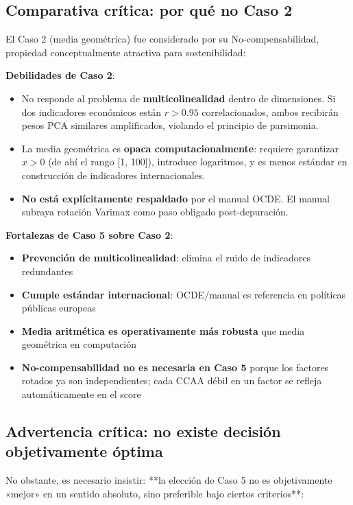 \subsection{Comparativa crítica: por qué no Caso 2}

El Caso 2 (media geométrica) fue considerado por su No-compensabilidad, propiedad conceptualmente atractiva para sostenibilidad:

\textbf{Debilidades de Caso 2}:
\begin{itemize}
    \item No responde al problema de \textbf{multicolinealidad} dentro de dimensiones. Si dos indicadores económicos están $r > 0.95$ correlacionados, ambos recibirán pesos PCA similares amplificados, violando el principio de parsimonia.
    \item La media geométrica es \textbf{opaca computacionalmente}: requiere garantizar $x > 0$ (de ahí el rango [1, 100]), introduce logaritmos, y es menos estándar en construcción de indicadores internacionales.
    \item \textbf{No está explícitamente respaldado} por el manual OCDE. El manual subraya rotación Varimax como paso obligado post-depuración.
\end{itemize}

\textbf{Fortalezas de Caso 5 sobre Caso 2}:
\begin{itemize}
    \item \textbf{Prevención de multicolinealidad}: elimina el ruido de indicadores redundantes
    \item \textbf{Cumple estándar internacional}: OCDE/manual es referencia en políticas públicas europeas
    \item \textbf{Media aritmética es operativamente más robusta} que media geométrica en computación
    \item \textbf{No-compensabilidad no es necesaria en Caso 5} porque los factores rotados ya son independientes; cada CCAA débil en un factor se refleja automáticamente en el score
\end{itemize}

\subsection{Advertencia crítica: no existe decisión objetivamente óptima}

No obstante, es necesario insistir: **la elección de Caso 5 no es objetivamente «mejor» en un sentido absoluto, sino preferible bajo ciertos criterios**:

